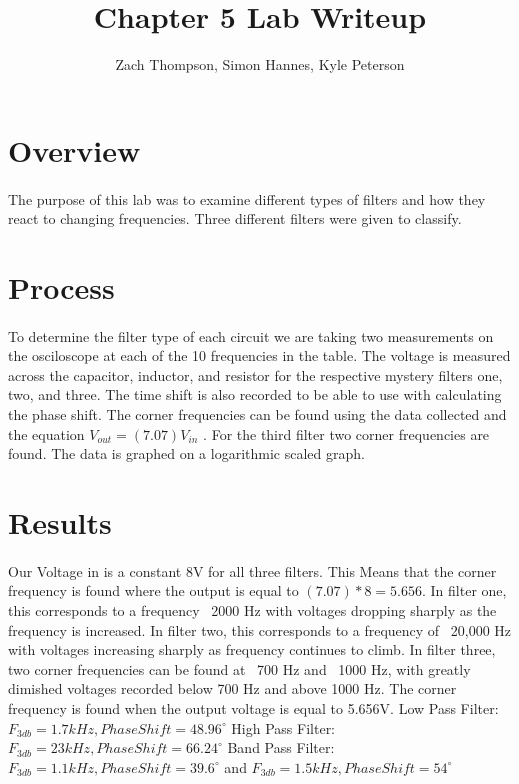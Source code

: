 \documentclass{article}
\title{Chapter 5 Lab Writeup}
\author{Zach Thompson, Simon Hannes, Kyle Peterson}
\begin{document}
\maketitle{}

\section*{Overview}
\paragraph{}
The purpose of this lab was to examine different types of filters and how they react to changing frequencies.
Three different filters were given to classify.



\section*{Process}
\paragraph{}
To determine the filter type of each circuit we are taking two measurements on the osciloscope at each of the 
10 frequencies in the table. The voltage is measured across the capacitor, inductor, and resistor for the 
respective mystery filters one, two, and three. The time shift is also recorded to be able to use with 
calculating the phase shift. The corner frequencies can be found using the data collected and the equation 
$ V_{out} = (7.07)   V_{in}$ . For the third filter two corner frequencies are found. The data is graphed on 
a logarithmic scaled graph.

\section*{Results}
\paragraph{}
Our Voltage in is a constant 8V for all three filters. This Means that the corner frequency is found where the output
 is equal to $(7.07) * 8 = 5.656$. In filter one, this corresponds to a frequency ~2000 Hz with voltages dropping 
 sharply as the frequency is increased. In filter two, this corresponds to a frequency of ~20,000 Hz with voltages increasing
 sharply as frequency continues to climb. In filter three, two corner frequencies can be found at ~700 Hz and ~1000 Hz, 
 with greatly dimished voltages recorded below 700 Hz and above 1000 Hz. 
The corner frequency is found when the output voltage is equal to 5.656V.
\newline
Low Pass Filter: $F_{3db} = 1.7kHz, Phase Shift = 48.96^{\circ}$
\newline
High Pass Filter: $F_{3db} = 23kHz, Phase Shift = 66.24^{\circ}$
\newline
Band Pass Filter: $F_{3db} = 1.1kHz, Phase Shift = 39.6^{\circ}$
and $F_{3db} = 1.5kHz, Phase Shift = 54^{\circ}$
\end{document}
